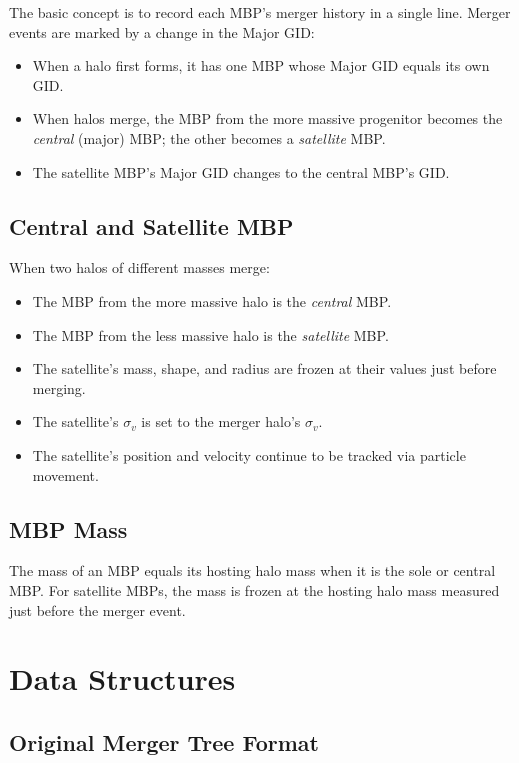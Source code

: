 \documentclass[11pt,fleqn]{book}
\begin{document}
The basic concept is to record each MBP's merger history in a single line.  Merger events are marked by a change in the Major GID:
\begin{itemize}[leftmargin=2em]
  \item When a halo first forms, it has one MBP whose Major GID equals its own GID.
  \item When halos merge, the MBP from the more massive progenitor becomes the \emph{central} (major) MBP; the other becomes a \emph{satellite} MBP.
  \item The satellite MBP's Major GID changes to the central MBP's GID.
\end{itemize}

\subsection{Central and Satellite MBP}

When two halos of different masses merge:
\begin{itemize}[leftmargin=2em]
  \item The MBP from the more massive halo is the \emph{central} MBP.
  \item The MBP from the less massive halo is the \emph{satellite} MBP.
  \item The satellite's mass, shape, and radius are frozen at their values just before merging.
  \item The satellite's $\sigma_v$ is set to the merger halo's $\sigma_v$.
  \item The satellite's position and velocity continue to be tracked via particle movement.
\end{itemize}

\subsection{MBP Mass}

The mass of an MBP equals its hosting halo mass when it is the sole or central MBP.  For satellite MBPs, the mass is frozen at the hosting halo mass measured just before the merger event.

\section{Data Structures}

\subsection{Original Merger Tree Format}
\end{document}
